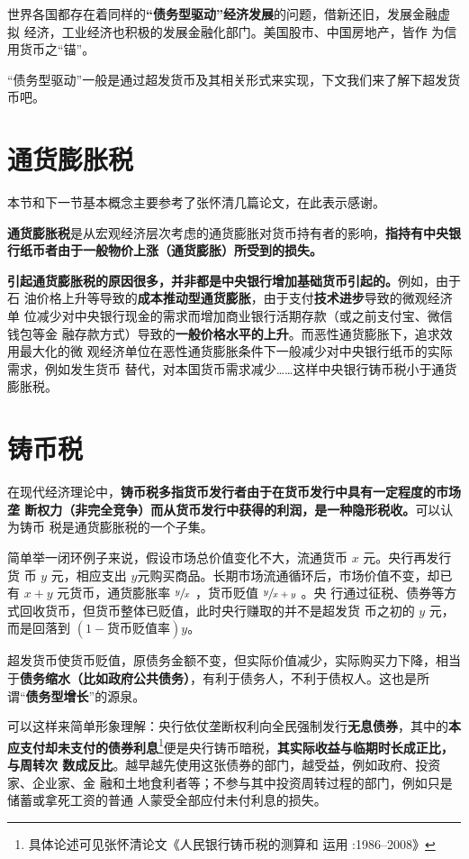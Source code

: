 世界各国都存在着同样的\textbf{“债务型驱动”经济发展}的问题，借新还旧，发展金融虚拟
经济，工业经济也积极的发展金融化部门。美国股市、中国房地产，皆作
为信用货币之“锚”。

“债务型驱动”一般是通过超发货币及其相关形式来实现，下文我们来了解下超发货币吧。


\section{通货膨胀税}

本节和下一节基本概念主要参考了张怀清几篇论文，在此表示感谢。

\textbf{通货膨胀税}是从宏观经济层次考虑的通货膨胀对货币持有者的影响，\textbf{指持有中央银
  行纸币者由于一般物价上涨（通货膨胀）所受到的损失。}

\textbf{引起通货膨胀税的原因很多，并非都是中央银行增加基础货币引起的。}例如，由于石
油价格上升等导致的\textbf{成本推动型通货膨胀}，由于支付\textbf{技术进步}导致的微观经济单
位减少对中央银行现金的需求而增加商业银行活期存款（或之前支付宝、微信钱包等金
融存款方式）导致的\textbf{一般价格水平的上升}。而恶性通货膨胀下，追求效用最大化的微
观经济单位在恶性通货膨胀条件下一般减少对中央银行纸币的实际需求，例如发生货币
替代，对本国货币需求减少……这样中央银行铸币税小于通货膨胀税。

\section{铸币税}

在现代经济理论中，\textbf{铸币税多指货币发行者由于在货币发行中具有一定程度的市场垄
  断权力（非完全竞争）而从货币发行中获得的利润，是一种隐形税收。}可以认为铸币
税是通货膨胀税的一个子集。

简单举一闭环例子来说，假设市场总价值变化不大，流通货币 $x$ 元。央行再发行货
币 $y$ 元，相应支出 $y$元购买商品。长期市场流通循环后，市场价值不变，却已
有 $x+y$ 元货币，通货膨胀率 $ \sfrac{y}{x}$ ，货币贬值 $\sfrac{y}{x+y}$ 。央
行通过征税、债券等方式回收货币，但货币整体已贬值，此时央行赚取的并不是超发货
币之初的 $y$ 元，而是回落到 $(1 - 货币贬值率)y$。

超发货币使货币贬值，原债务金额不变，但实际价值减少，实际购买力下降，相当
于\textbf{债务缩水（比如政府公共债务）}，有利于债务人，不利于债权人。这也是所
谓“\textbf{债务型增长}”的源泉。

可以这样来简单形象理解：央行依仗垄断权利向全民强制发行\textbf{无息债券}，其中的\textbf{本
  应支付却未支付的债券利息}\footnote{具体论述可见张怀清论文《人民银行铸币税的测算和
  运用 :1986--2008》}便是央行铸币暗税，\textbf{其实际收益与临期时长成正比，与周转次
  数成反比}。越早越先使用这张债券的部门，越受益，例如政府、投资家、企业家、金
融和土地食利者等；不参与其中投资周转过程的部门，例如只是储蓄或拿死工资的普通
人蒙受全部应付未付利息的损失。

